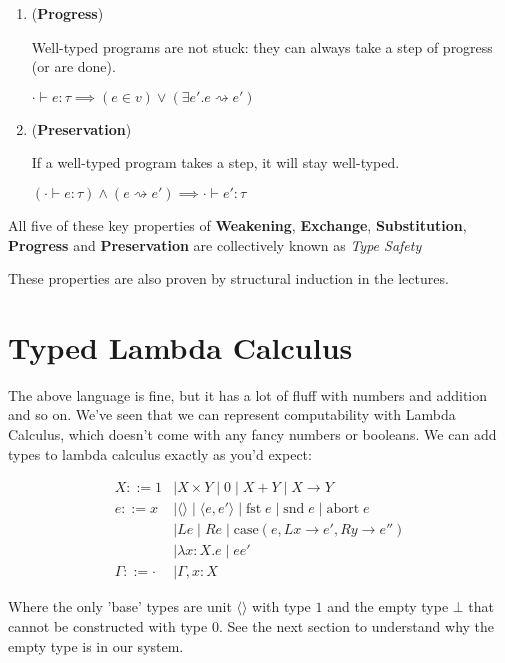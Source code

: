 \documentclass{article}
\begin{document}
\begin{enumerate}
\item  (\textbf{Progress})

Well-typed programs are not stuck: they can always take a step of progress (or are done).

$\cdot  \vdash e : \tau \implies (e \in v) \lor (\exists e'. e \rightsquigarrow e')$

\item  (\textbf{Preservation})

If a well-typed program takes a step, it will stay well-typed.

$(\cdot  \vdash e : \tau) \land (e \rightsquigarrow e') \implies \cdot  \vdash e' : \tau$
\end{enumerate}

All five of these key properties of \textbf{Weakening}, \textbf{Exchange}, \textbf{Substitution}, \textbf{Progress} and \textbf{Preservation} are collectively known as \textit{Type Safety}

These properties are also proven by structural induction in the lectures.

\newpage
\section{Typed Lambda Calculus}

The above language is fine, but it has a lot of fluff with numbers and addition and so on. We've seen that we can represent computability with Lambda Calculus, which doesn't come with any fancy numbers or booleans. We can add types to lambda calculus exactly as you'd expect: 

\begin{equation*}
\begin{split}
X ::= 1 &| X \times Y \; | \; 0 \; | \; X + Y \; | \; X \to Y \\
e ::= x &| \langle \rangle  \; | \; \langle e, e'\rangle  \; | \; \textrm{fst} \; e \; | \; \textrm{snd} \; e \; | \; \textrm{abort} \; e \\
&| L e \; | \; R e \; | \; \textrm{case}(e, L x \to e', R y \to e'') \\
&| \lambda x : X. e \; | \; e e' \\
\Gamma ::= \cdot  &| \Gamma, x : X
\end{split}
\end{equation*}

Where the only 'base' types are unit $\langle \rangle $  with type $1$ and the empty type $\bot$ that cannot be constructed with type $0$. See the next section to understand why the empty type is in our system.
\end{document}
